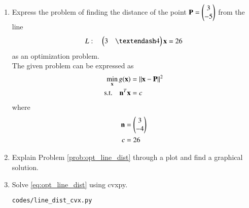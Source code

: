 \renewcommand{\theequation}{\theenumi}
\begin{enumerate}[label=\arabic*.,ref=\thesection.\theenumi]
%
%
\item Express the problem of finding the distance of the point $\mathbf{P}=\begin{pmatrix}3\\-5\end{pmatrix}$ from the line 
\label{prob:opt_line_dist}
\begin{align}
\label{eq:opt_line_nor}
L: \quad \myvec{3 & – 4}\vec{x}  = 26
\end{align}
%
as an optimization problem.
\\
\solution The given problem can be expressed as
%
\begin{align}
\label{eq:opt_line_dist}
\min_{\mathbf{x}}g(\mathbf{x}) &= \left\lVert\mathbf{x}-\mathbf{P}\right\rVert^2
\\
\text{s.t.} \quad \mathbf{n}^T\mathbf{x} &= c
\label{eq:opt_line_dist_nor}
\end{align}
%
where 
%
\begin{align}
\mathbf{n} &= \begin{pmatrix}3\\-4\end{pmatrix}
\\
c&=26
\end{align}
%
\item Explain Problem \ref{prob:opt_line_dist} through a plot and find a graphical solution.
%
\item Solve \eqref{eq:opt_line_dist} using cvxpy.
%
\\
\solution
%	
\begin{lstlisting}
codes/line_dist_cvx.py
\end{lstlisting}


\end{enumerate}
